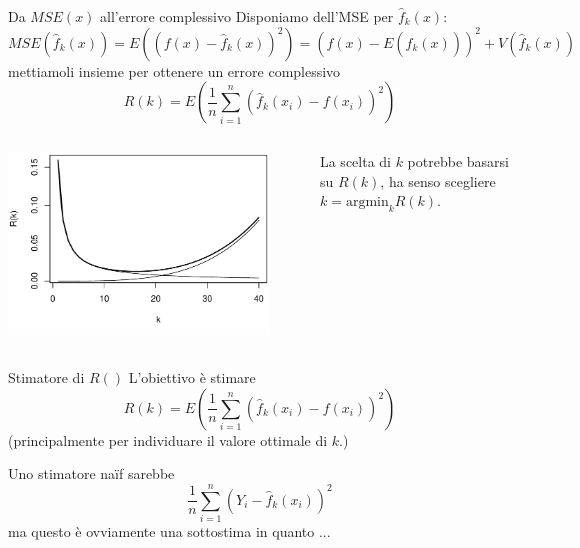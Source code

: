 \documentclass{beamer}\usepackage[]{graphicx}\usepackage[]{color}
\newenvironment{knitrout}{}{} %
\newcommand{\spazio}{\noindent\makebox[\linewidth]{\resizebox{0.1\linewidth}{1pt}{{$\bullet$}}}}
\begin{document}
\begin{frame}{Da $MSE(x)$ all'errore complessivo}
Disponiamo dell'MSE per $\hat{f}_k(x)$:
\[
 MSE(\hat{f}_k(x)) =  E((f(x)-\hat{f}_k(x))^2) = (f(x)-E(\hat{f}_k(x)))^2 + V(\hat{f}_k(x)) %
\]
mettiamoli insieme per ottenere un errore complessivo
\[ R(k) = E\left(\frac{1}{n}\sum_{i=1}^n (\hat{f}_k(x_i) - f(x_i))^2\right) \]
\begin{columns}
\begin{knitrout}
\color{fgcolor}
\includegraphics[width=0.9\textwidth]{figure/020-regression-1unnamed-chunk-13-1} 

\end{knitrout}
La scelta di $k$ potrebbe basarsi su $R(k)$, ha senso scegliere $k=\mbox{argmin}_k R(k)$.
\end{columns}
\end{frame}

\begin{frame}{Stimatore di $R()$}
L'obiettivo \`e stimare
\[ R(k) = E\left(\frac{1}{n}\sum_{i=1}^n (\hat{f}_k(x_i) - f(x_i))^2\right) \]
(principalmente per individuare il valore ottimale di $k$.)

\spazio

Uno stimatore na\"if sarebbe
\[  \frac{1}{n} \sum_{i=1}^n (Y_i-\hat{f}_k(x_i))^2 \]
ma questo \`e ovviamente una sottostima in quanto ...

\end{frame}
\end{document}
